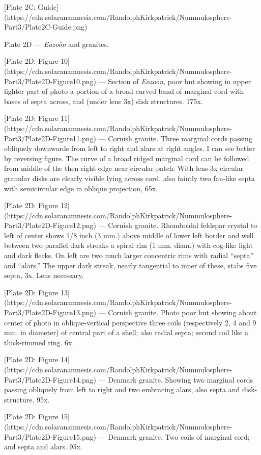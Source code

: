 \documentclass[a4paper, 12pt, oneside]{article}
\begin{document}
[Plate 2C: Guide](https://cdn.solaranamnesis.com/RandolphKirkpatrick/Nummulosphere-Part3/Plate2C-Guide.png)

Plate 2D --- \emph{Eozoön} and granites.

[Plate 2D: Figure 10](https://cdn.solaranamnesis.com/RandolphKirkpatrick/Nummulosphere-Part3/Plate2D-Figure10.png) --- Section of \emph{Eozoön}, poor but showing in upper lighter part of photo a portion of a broad curved band of marginal cord with bases of septa across, and (under lens 3x) disk structures. 175x.

[Plate 2D: Figure 11](https://cdn.solaranamnesis.com/RandolphKirkpatrick/Nummulosphere-Part3/Plate2D-Figure11.png) --- Cornish granite. Three marginal cords passing obliquely downwards from left to right and alars at right angles. I can see better by reversing figure. The curve of a broad ridged marginal cord can be followed from middle of the then right edge near circular patch. With lens 3x circular granular disks are clearly visible lying across cord, also faintly two fan-like septa with semicircular edge in oblique projection, 65x.

[Plate 2D: Figure 12](https://cdn.solaranamnesis.com/RandolphKirkpatrick/Nummulosphere-Part3/Plate2D-Figure12.png) --- Cornish granite. Rhomboidal feldspar crystal to left of center shows 1/8 inch (3 mm.) above middle of lower left border and well between two parallel dark streaks a spiral rim (1 mm. diam.) with cog-like light and dark flecks. On left are two much larger concentric rims with radial ``septa'' and ``alars.'' The upper dark streak, nearly tangential to inner of these, stabs five septa, 3x. Lens necessary.

[Plate 2D: Figure 13](https://cdn.solaranamnesis.com/RandolphKirkpatrick/Nummulosphere-Part3/Plate2D-Figure13.png) --- Cornish granite. Photo poor but showing about center of photo in oblique-vertical perspective three coils (respectively 2, 4 and 9 mm. in diameter) of central part of a shell; also radial septa; second coil like a thick-rimmed ring. 6x.

[Plate 2D: Figure 14](https://cdn.solaranamnesis.com/RandolphKirkpatrick/Nummulosphere-Part3/Plate2D-Figure14.png) --- Denmark granite. Showing two marginal cords passing obliquely from left to right and two embracing alars, also septa and disk-structure. 95x.

[Plate 2D: Figure 15](https://cdn.solaranamnesis.com/RandolphKirkpatrick/Nummulosphere-Part3/Plate2D-Figure15.png) --- Denmark granite. Two coils of marginal cord; and septa and alars. 95x.
\end{document}
